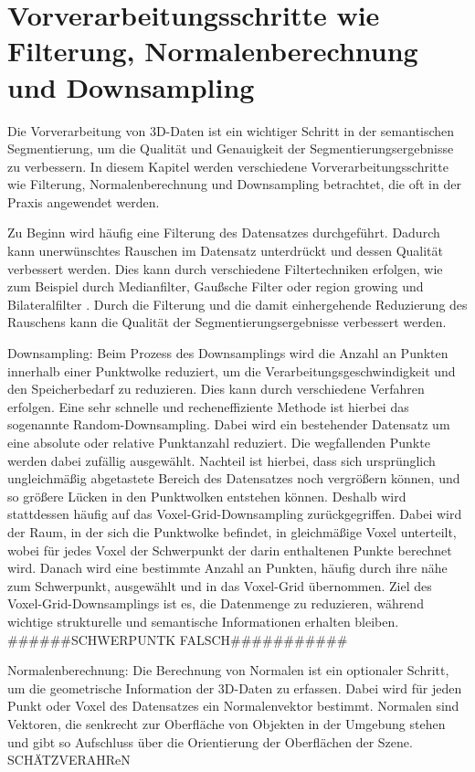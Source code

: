 \section{Vorverarbeitungsschritte wie Filterung, Normalenberechnung und Downsampling}

Die Vorverarbeitung von 3D-Daten ist ein wichtiger Schritt in der semantischen
Segmentierung, um die Qualität und Genauigkeit der Segmentierungsergebnisse zu
verbessern. In diesem Kapitel werden verschiedene Vorverarbeitungsschritte wie
Filterung, Normalenberechnung und Downsampling betrachtet, die oft in der
Praxis angewendet werden.

Zu Beginn wird häufig eine Filterung des Datensatzes durchgeführt. Dadurch kann
unerwünschtes Rauschen im Datensatz unterdrückt und dessen Qualität verbessert
werden. Dies kann durch verschiedene Filtertechniken erfolgen, wie zum Beispiel
durch Medianfilter, Gaußsche Filter \cite{9191237} oder region growing und
Bilateralfilter \cite{6460813}. Durch die Filterung und die damit einhergehende
Reduzierung des Rauschens kann die Qualität der Segmentierungsergebnisse
verbessert werden.

Downsampling: Beim Prozess des Downsamplings wird die Anzahl an Punkten
innerhalb einer Punktwolke reduziert, um die Verarbeitungsgeschwindigkeit und
den Speicherbedarf zu reduzieren. Dies kann durch verschiedene Verfahren
erfolgen. Eine sehr schnelle und recheneffiziente Methode ist hierbei das
sogenannte Random-Downsampling. Dabei wird ein bestehender Datensatz um eine
absolute oder relative Punktanzahl reduziert. Die wegfallenden Punkte werden
dabei zufällig ausgewählt. Nachteil ist hierbei, dass sich ursprünglich
ungleichmäßig abgetastete Bereich des Datensatzes noch vergrößern können, und
so größere Lücken in den Punktwolken entstehen können. Deshalb wird stattdessen
häufig auf das Voxel-Grid-Downsampling zurückgegriffen. Dabei wird der Raum, in
der sich die Punktwolke befindet, in gleichmäßige Voxel unterteilt, wobei für
jedes Voxel der Schwerpunkt der darin enthaltenen Punkte berechnet wird. Danach
wird eine bestimmte Anzahl an Punkten, häufig durch ihre nähe zum Schwerpunkt,
ausgewählt und in das Voxel-Grid übernommen. Ziel des Voxel-Grid-Downsamplings
ist es, die Datenmenge zu reduzieren, während wichtige strukturelle und
semantische Informationen erhalten bleiben. ######SCHWERPUNTK FALSCH###########

Normalenberechnung: Die Berechnung von Normalen ist ein optionaler Schritt, um
die geometrische Information der 3D-Daten zu erfassen. Dabei wird für jeden
Punkt oder Voxel des Datensatzes ein Normalenvektor bestimmt. Normalen sind
Vektoren, die senkrecht zur Oberfläche von Objekten in der Umgebung stehen und
gibt so Aufschluss über die Orientierung der Oberflächen der Szene.
SCHÄTZVERAHReN

